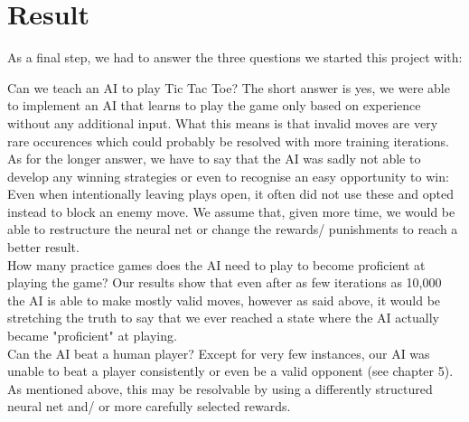 \section{Result}
As a final step, we had to answer the three questions we started this project with:

Can we teach an AI to play Tic Tac Toe?
The short answer is yes, we were able to implement an AI that learns to play the game only based on experience without any additional input. What this means is that invalid moves are very rare occurences which could probably be resolved with more training iterations.
As for the longer answer, we have to say that the AI was sadly not able to develop any winning strategies or even to recognise an easy opportunity to win: Even when intentionally leaving plays open, it often did not use these and opted instead to block an enemy move.
We assume that, given more time, we would be able to restructure the neural net or change the rewards/ punishments to reach a better result.
\\

How many practice games does the AI need to play to become proficient at playing the game?
Our results show that even after as few iterations as 10,000 the AI is able to make mostly valid moves, however as said above, it would be stretching the truth to say that we ever reached a state where the AI actually became "proficient" at playing.
\\

Can the AI beat a human player?
Except for very few instances, our AI was unable to beat a player consistently or even be a valid opponent (see chapter 5). As mentioned above, this may be resolvable by using a differently structured neural net and/ or more carefully selected rewards.